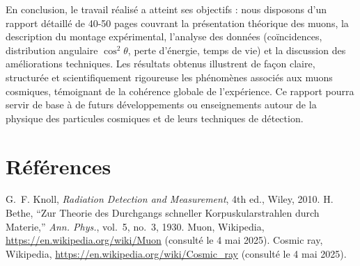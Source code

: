 \documentclass[a4paper,12pt,twoside]{article}
\begin{document}
En conclusion, le travail réalisé a atteint ses objectifs : nous disposons d’un rapport détaillé de 40-50 pages couvrant la présentation théorique des muons, la description du montage expérimental, l’analyse des données (coïncidences, distribution angulaire $\cos^2\theta$, perte d’énergie, temps de vie) et la discussion des améliorations techniques. Les résultats obtenus illustrent de façon claire, structurée et scientifiquement rigoureuse les phénomènes associés aux muons cosmiques, témoignant de la cohérence globale de l’expérience. Ce rapport pourra servir de base à de futurs développements ou enseignements autour de la physique des particules cosmiques et de leurs techniques de détection.

\section*{Références}
\begin{thebibliography}{9}
 G.~F. Knoll, \emph{Radiation Detection and Measurement}, 4th ed., Wiley, 2010.
 H. Bethe, ``Zur Theorie des Durchgangs schneller Korpuskularstrahlen durch Materie,'' \emph{Ann. Phys.}, vol.~5, no.~3, 1930.
 Muon, Wikipedia, \url{https://en.wikipedia.org/wiki/Muon} (consulté le 4 mai 2025).
 Cosmic ray, Wikipedia, \url{https://en.wikipedia.org/wiki/Cosmic_ray} (consulté le 4 mai 2025).
\end{thebibliography}
\end{document}
